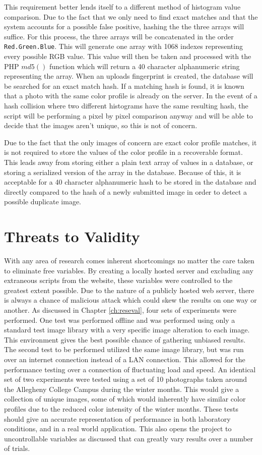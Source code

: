 This requirement better lends itself to a different method of histogram value comparison. Due to the fact that we only need to find exact matches and that the system accounts for a possible false positive, hashing the the three arrays will suffice. For this process, the three arrays will be concatenated in the order {\tt Red.Green.Blue}. This will generate one array with 1068 indexes representing every possible RGB value. This value will then be taken and processed with the PHP $md5()$ function which will return a 40 character alphanumeric string representing the array. When an uploads fingerprint is created, the database will be searched for an exact match hash. If a matching hash is found, it is known that a photo with the same color profile is already on the server. In the event of a hash collision where two different histograms have the same resulting hash, the script will be performing a pixel by pixel comparison anyway and will be able to decide that the images aren't unique, so this is not of concern.

Due to the fact that the only images of concern are exact color profile matches, it is not required to store the values of the color profile in a recoverable format. This leads away from storing either a plain text array of values in a database, or storing a serialized version of the array in the database. Because of this, it is acceptable for a 40 character alphanumeric hash to be stored in the database and directly compared to the hash of a newly submitted image in order to detect a possible duplicate image.

\section{Threats to Validity}  \label{sec:threats}
With any area of research comes inherent shortcomings no matter the care taken to eliminate free variables. By creating a locally hosted server and excluding any extraneous scripts from the website, these variables were controlled to the greatest extent possible. Due to the nature of a publicly hosted web server, there is always a chance of malicious attack which could skew the results on one way or another. As discussed in Chapter \ref{ch:reseval}, four sets of experiments were performed. One test was performed offline and was performed using only a standard test image library with a very specific image alteration to each image. This environment gives the best possible chance of gathering unbiased results. The second test to be performed utilized the same image library, but was run over an internet connection instead of a LAN connection. This allowed for the performance testing over a connection of fluctuating load and speed. An identical set of two experiments were tested using a set of 10 photographs taken around the Allegheny College Campus during the winter months. This would give a collection of unique images, some of which would inherently have similar color profiles due to the reduced color intensity of the winter months. These tests should give an accurate representation of performance in both laboratory conditions, and in a real world application. This also opens the project to uncontrollable variables as discussed that can greatly vary results over a number of trials.

